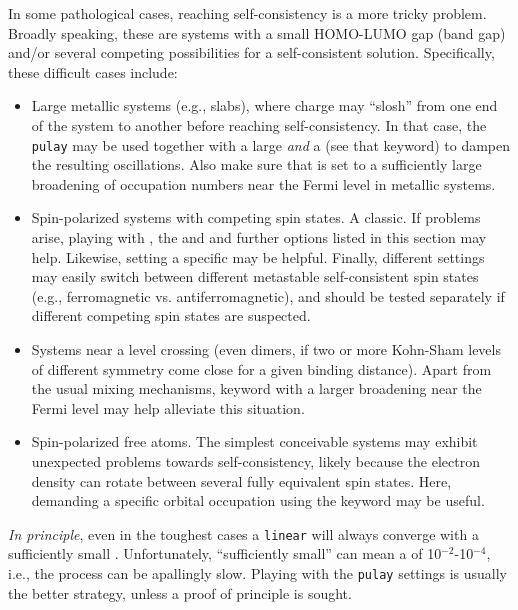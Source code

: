 In some pathological cases, reaching self-consistency is a more tricky
problem. Broadly speaking, these are systems with a small HOMO-LUMO
gap (band gap) and/or several competing possibilities for a
self-consistent solution. Specifically, these difficult cases include:
\begin{itemize}
  \item Large metallic systems (e.g., slabs), where charge may
    ``slosh'' from one end of the system to another before reaching
    self-consistency. In that case, the \texttt{pulay} 
    may be used together with a large 
    \emph{and} a  (see that keyword) to dampen
    the resulting oscillations. Also make sure that
     is set to a sufficiently large
    broadening of occupation numbers near the Fermi level in metallic
    systems.
  \item Spin-polarized systems with competing spin states. A
    classic. If problems arise, playing with
    , the 
    and  and further options listed in this
    section may help. Likewise, setting a specific
     may be helpful. Finally, different
     settings may easily switch between
    different metastable self-consistent spin states (e.g.,
    ferromagnetic vs. antiferromagnetic), and should be tested
    separately if different competing spin states are suspected.
  \item Systems near a level crossing (even dimers, if two or more
    Kohn-Sham levels of different symmetry come close for a given
    binding distance). Apart from the usual mixing mechanisms, keyword
     with a larger broadening near the Fermi
    level may help alleviate this situation.
  \item Spin-polarized free atoms. The simplest conceivable systems
    may exhibit unexpected problems towards self-consistency, likely
    because the electron density can rotate between several fully
    equivalent spin states. Here, demanding a specific orbital
    occupation using the
     keyword may be useful.
\end{itemize}
\emph{In principle}, even in the toughest cases
a \texttt{linear}  will always converge with a
sufficiently small . Unfortunately,
``sufficiently small'' can mean a  of
10$^{-2}$-10$^{-4}$, i.e., the process can be apallingly slow. Playing
with the \texttt{pulay}  settings is usually the better
strategy, unless a proof of principle is sought.

